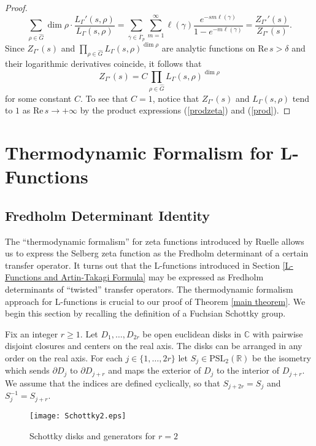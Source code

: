 \documentclass[12pt]{article}
\newcommand{\RR}{\mathbb{R}}
\newcommand{\CC}{\mathbb{C}}
\newcommand{\PSL}{\mathrm{PSL}}
\newcommand{\R}{\mathrm{Re}\,}
\begin{document}
\begin{proof}
$$ \sum_{\rho\in \widehat{G}} \dim \rho \cdot \frac{L_{\Gamma}'(s,\rho)}{L_{\Gamma}(s,\rho)} =  \sum_{\overline{\gamma}\in \overline{\Gamma}_{p}}\sum_{m=1}^{\infty} \ell(\gamma)  \frac{e^{-sm\ell(\gamma)}}{1-e^{-m\ell(\gamma)}} = \frac{Z_{\Gamma'}'(s)}{Z_{\Gamma'}(s)}. $$
Since $ Z_{\Gamma'}(s) $ and $  \prod_{\rho\in \widehat{G}} L_{\Gamma}(s,\rho)^{\dim \rho} $ are analytic functions on $ \R s > \delta $ and their logarithmic derivatives coincide, it follows that
$$ Z_{\Gamma'}(s) = C\prod_{\rho\in \widehat{G}} L_{\Gamma}(s,\rho)^{\dim \rho} $$
for some constant $ C $. To see that $ C=1 $, notice that  $ Z_{\Gamma'}(s) $ and $ L_{\Gamma}(s, \rho) $ tend to $ 1 $ as $ \R s\to +\infty $ by the product expressions (\ref{prodzeta}) and (\ref{prod}).
\end{proof}

\section{Thermodynamic Formalism for L-Functions} \label{Thermodynamic Formalism Approach for L-Functions}


\subsection{Fredholm Determinant Identity}

The ``thermodynamic formalism'' for zeta functions introduced by Ruelle \cite{Ruelle} allows us to express the Selberg zeta function as the Fredholm determinant of a certain transfer operator. It turns out that the L-functions introduced in Section \ref{L-Functions and Artin-Takagi Formula} may be expressed as Fredholm determinants of ``twisted'' transfer operators. The thermodynamic formalism approach for L-functions is crucial to our proof of Theorem \ref{main theorem}. We begin this section by recalling the definition of a Fuchsian Schottky group.

Fix an integer $ r\geq 1 $. Let $ D_{1}, \dots, D_{2r} $ be open euclidean disks in $ \CC $ with pairwise disjoint closures and centers on the real axis. The disks can be arranged in any order on the real axis. For each $ j\in \lbrace 1, \dots, 2r\rbrace $ let $ S_{j}\in \PSL_{2}(\RR)  $ be the isometry which sends $ \partial D_{j} $ to $ \partial D_{j+r} $ and maps the exterior of $ D_{j} $ to the interior of $ D_{j+r} $. We assume that the indices are defined cyclically, so that $ S_{j+2r} = S_{j} $ and $ S_{j}^{-1} = S_{j+r} $.

\begin{figure}[h]
\centering
\texttt{[image: Schottky2.eps]}
\caption{Schottky disks and generators for $ r=2 $}
\end{figure}
\end{document}
